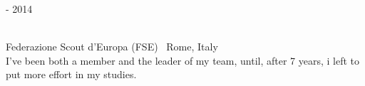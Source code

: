 \bigskip

\begin{minipage}{.3\textwidth}
	 - 2014 \faCalendar
\end{minipage}
\hfill
\begin{minipage}{.64\textwidth}
	\vfill
	 \\
	\color{Maroon} Federazione Scout d'Europa (FSE) \color{Sepia} \hfill \faMapMarker \ Rome, Italy
	\smallskip
	\\
	\color{gray} I've been both a member and the leader of my team, until, after 7 years, i left to put more effort in my studies.
	\vfill
\end{minipage}
